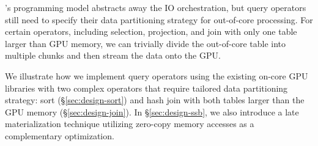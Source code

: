 \THISWORK's programming model abstracts away the IO orchestration, but query operators still need to specify their data partitioning strategy for out-of-core processing.
For certain operators, including selection, projection, and join with only one table larger than GPU memory, we can
trivially divide the out-of-core table into multiple chunks and then stream the data onto the GPU.

We illustrate how we implement query operators using the existing on-core GPU libraries with two complex operators that require tailored data partitioning strategy: sort (\S\ref{sec:design-sort}) and hash join with both tables larger than the GPU memory (\S\ref{sec:design-join}).
In \S\ref{sec:design-ssb}, we also introduce a late materialization technique utilizing zero-copy memory accesses as a complementary optimization.


\begin{comment}
\textbf{Example Applications. }
While our programming model relieves the burden of orchestrating IO operations manually and allows the reuse of existing code, each application still needs to define how to partition the data and glue simple GPU kernels together to accomplish more complicated tasks.
Under our programming model, we design sort (\S~\ref{sec:design-sort}) and hash join (\S~\ref{sec:design-join}) as examples.
We implement our sort only with existing GPU libraries and hash join with both existing GPU code and our customized kernels.
Finally, we explain how to perform out-of-core query processing on star schema with our framework and discuss how to use zero-copy memory accesses to further improve query processing performance (\S~\ref{sec:design-ssb}).
All applications achieve state-of-the-art performance, and help us understand the difference brought by our IO redistribution idea.
\end{comment}



